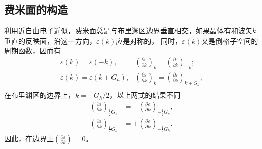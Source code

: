             \subsection{费米面的构造}
                利用近自由电子近似，费米面总是与布里渊区边界垂直相交，如果晶体有和波矢$k$垂直的反映面，沿这一方向，$\varepsilon(k)$应是对称的，
                同时，$\varepsilon(k)$又是倒格子空间的周期函数，因而有
                \begin{align}
                    \varepsilon(k)=\varepsilon(-k),&\left( \frac{\partial\varepsilon}{\partial k} \right)_k=\left( \frac{\partial\varepsilon}{\partial k} \right)_{-k};\\
                    \varepsilon(k)=\varepsilon(k+G_h),&\left( \frac{\partial\varepsilon}{\partial k} \right)_k=\left( \frac{\partial\varepsilon}{\partial k} \right)_{k+G_h};\\
                \end{align}
                在布里渊区的边界上，$k=\pm G_h/2$，以上两式的结果不同
                \begin{align}
                    \left( \frac{\partial\varepsilon}{\partial k} \right)_{\frac{1}{2}G_h}&=-\left( \frac{\partial\varepsilon}{\partial k} \right)_{-\frac{1}{2}G_h},\\
                    \left( \frac{\partial\varepsilon}{\partial k} \right)_{\frac{1}{2}G_h}&=+ \left( \frac{\partial\varepsilon}{\partial k} \right)_{-\frac{1}{2}G_h}.
                \end{align}
                因此，在边界上$\left( \frac{\partial\varepsilon}{\partial k} \right)=0$。

